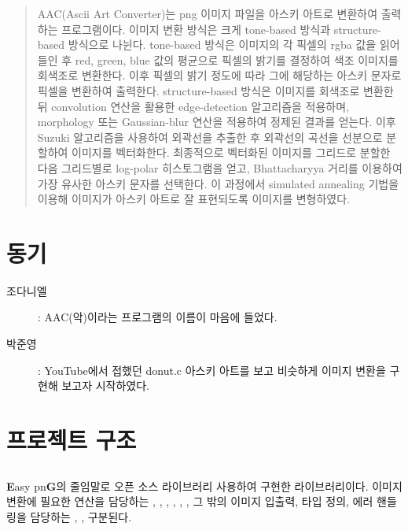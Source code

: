 \documentclass[conference]{IEEEtran}
\begin{document}
\maketitle

\begin{abstract}
AAC(Ascii Art Converter)는 png 이미지 파일을 아스키 아트로 변환하여 출력하는 프로그램이다.
이미지 변환 방식은 크게 tone-based 방식과 structure-based 방식으로 나뉜다.
tone-based 방식은 이미지의 각 픽셀의 rgba 값을 읽어들인 후 red, green, blue 값의 평균으로 픽셀의 밝기를 결정하여 색조 이미지를 회색조로 변환한다.
이후 픽셀의 밝기 정도에 따라 그에 해당하는 아스키 문자로 픽셀을 변환하여 출력한다.
structure-based 방식은 이미지를 회색조로 변환한 뒤 convolution 연산을 활용한 edge-detection 알고리즘을 적용하며, morphology 또는 Gaussian-blur 연산을 적용하여 정제된 결과를 얻는다.
이후 Suzuki 알고리즘을 사용하여 외곽선을 추출한 후 외곽선의 곡선을 선분으로 분할하여 이미지를 벡터화한다.
최종적으로 벡터화된 이미지를 그리드로 분할한 다음 그리드별로 log-polar 히스토그램을 얻고, Bhattacharyya 거리를 이용하여 가장 유사한 아스키 문자를 선택한다.
이 과정에서 simulated annealing 기법을 이용해 이미지가 아스키 아트로 잘 표현되도록 이미지를 변형하였다.
\end{abstract}

\section{동기}
\begin{description}
    \item[조다니엘]\hspace{1em}: AAC(악)이라는 프로그램의 이름이 마음에 들었다.
    \item[박준영]: YouTube에서 접했던 donut.c 아스키 아트를 보고 비슷하게 이미지 변환을 구현해 보고자 시작하였다.\cite{donut}
\end{description}

\section{프로젝트 구조}

\subsection{\eg}

 \textbf{E}asy pn\textbf{G}의 줄임말로 오픈 소스 라이브러리   사용하여 구현한 라이브러리이다.
 이미지 변환에 필요한 연산을 담당하는 \egGeometry, \egMath, \egMethods, \egOperators, \egProcessing, \egTrace,  그 밖의 이미지 입출력, 타입 정의, 에러 핸들링을 담당하는 \egLoader, \egTypes,  구분된다.
\end{document}
